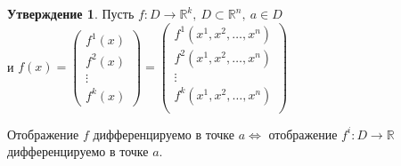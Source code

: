 \documentclass{report}
\theoremstyle{definition}
\newtheorem{statement}{Утверждение}[section]
\begin{document}
\begin{statement}
  Пусть $f:D\rightarrow\mathbb{R}^k, \ D \subset \mathbb{R}^n, \ a \in D$ \\ и $f(x) = \left(
    \begin{array}{c}
        f^1(x) \\
        f^2(x) \\
        \vdots \\
        f^k(x)
      \end{array}
    \right) = \left(
    \begin{array}{c}
        f^1(x^1,x^2,\ldots,x^n) \\
        f^2(x^1,x^2,\ldots,x^n) \\
        \vdots                  \\
        f^k(x^1,x^2,\ldots,x^n) \\
      \end{array}
    \right)$

  Отображение $f$ дифференцируемо в точке $a \iff$ отображение $f^i: D \rightarrow \mathbb{R}$ дифференцируемо
  в точке $a$.
\end{statement}
\end{document}
